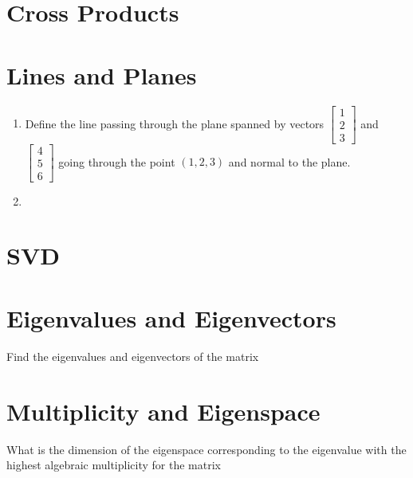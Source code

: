 \documentclass{ximera}
\begin{document}
\section*{Cross Products}

\section*{Lines and Planes}

\begin{example}

    \begin{enumerate}
        \item Define the line passing through the plane spanned by vectors $\begin{bmatrix} 1 \\ 2 \\ 3 \end{bmatrix}$ and $\begin{bmatrix} 4 \\ 5 \\ 6 \end{bmatrix}$ going through the point $(1,2,3)$ and normal to the plane.
        \item %
        
    \end{enumerate}
\end{example}


\section*{SVD}


\section*{Eigenvalues and Eigenvectors}

\begin{example}
    Find the eigenvalues and eigenvectors of the matrix 

    
\end{example}

\section*{Multiplicity and Eigenspace}

\begin{example}
    What is the dimension of the eigenspace corresponding to the eigenvalue with the highest algebraic multiplicity for the matrix 



\end{example}
\end{document}
